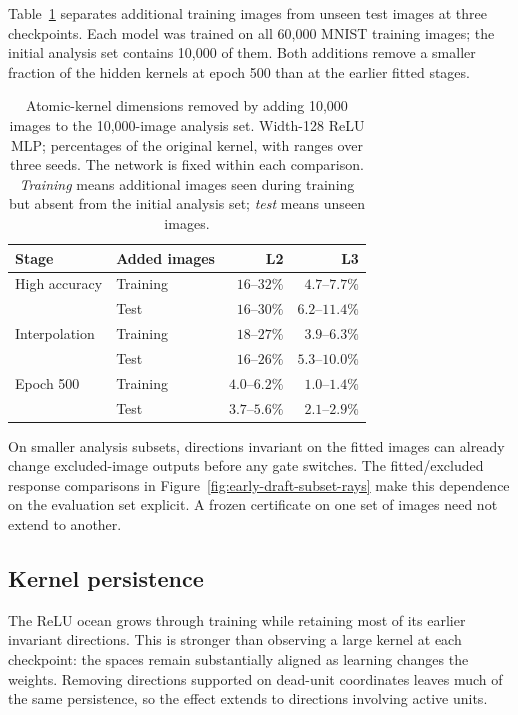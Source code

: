 Table~\ref{tab:newdata-main} separates additional training images from unseen test images at three checkpoints. Each model was trained on all 60,000 MNIST training images; the initial analysis set contains 10,000 of them. Both additions remove a smaller fraction of the hidden kernels at epoch 500 than at the earlier fitted stages.
\begin{table}[!htbp]
\centering
\caption{Atomic-kernel dimensions removed by adding 10,000 images to the 10,000-image analysis set. Width-128 ReLU MLP; percentages of the original kernel, with ranges over three seeds. The network is fixed within each comparison. \emph{Training} means additional images seen during training but absent from the initial analysis set; \emph{test} means unseen images.}
\label{tab:newdata-main}
\small\setlength{\tabcolsep}{4pt}
\begin{tabular}{llrr}
\toprule
Stage & Added images & L2 & L3\\
\midrule
High accuracy & Training & $16$--$32\%$ & $4.7$--$7.7\%$\\
 & Test & $16$--$30\%$ & $6.2$--$11.4\%$\\
Interpolation & Training & $18$--$27\%$ & $3.9$--$6.3\%$\\
 & Test & $16$--$26\%$ & $5.3$--$10.0\%$\\
Epoch 500 & Training & $4.0$--$6.2\%$ & $1.0$--$1.4\%$\\
 & Test & $3.7$--$5.6\%$ & $2.1$--$2.9\%$\\
\bottomrule
\end{tabular}
\end{table}





On smaller analysis subsets, directions invariant on the fitted images can already change excluded-image outputs before any gate switches. The fitted/excluded response comparisons in Figure~\ref{fig:early-draft-subset-rays} make this dependence on the evaluation set explicit. A frozen certificate on one set of images need not extend to another.


\subsection{Kernel persistence}
\label{app:persistence}\label{app:persistence-newdata}
The ReLU ocean grows through training while retaining most of its earlier invariant directions. This is stronger than observing a large kernel at each checkpoint: the spaces remain substantially aligned as learning changes the weights. Removing directions supported on dead-unit coordinates leaves much of the same persistence, so the effect extends to directions involving active units.

